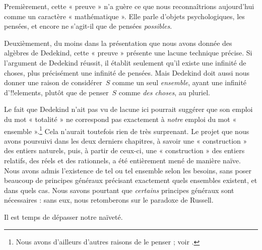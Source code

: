 \documentclass[../../../include/open-logic-section]{subfiles}
\begin{document}
Premièrement, cette « preuve » n'a guère ce que nous reconnaîtrions
aujourd'hui comme un caractère « mathématique ». Elle parle d'objets
psychologiques, les pensées, et encore ne s'agit-il que de pensées
\emph{possibles}.

Deuxièmement, du moins dans la présentation que nous avons donnée des
algèbres de Dedekind, cette « preuve » présente une lacune technique
précise. Si l'argument de Dedekind réussit, il établit seulement qu'il
existe une infinité de choses, plus précisément une infinité de pensées.
Mais Dedekind doit aussi nous donner une raison de considérer~$S$ comme
un seul \emph{ensemble}, ayant une infinité d'!!{element}s, plutôt que
de penser~$S$ comme \emph{des choses}, au pluriel.

Le fait que Dedekind n'ait pas vu de lacune ici pourrait suggérer que
son emploi du mot « totalité » ne correspond pas exactement à
\emph{notre} emploi du mot « ensemble ».\footnote{Nous avons d'ailleurs
d'autres raisons de le penser ; voir \citet[p.~23]{Potter2004}.}
Cela n'aurait toutefois rien de très surprenant. Le projet que nous
avons poursuivi dans les deux derniers chapitres, à savoir une
« construction » des entiers naturels, puis, à partir de ceux-ci,
une « construction » des entiers relatifs, des réels et des rationnels,
a été entièrement mené de manière naïve. Nous avons admis l'existence de tel
ou tel ensemble selon les besoins, sans poser beaucoup de principes
généraux précisant exactement quels ensembles existent, et dans quels cas.
Nous savons pourtant que \emph{certains} principes généraux sont
nécessaires : sans eux, nous retomberons sur le paradoxe de Russell.

Il est temps de dépasser notre naïveté.
\end{document}
